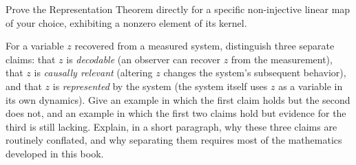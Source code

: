 \begin{exercise}
Prove the Representation Theorem directly for a specific non-injective
linear map of your choice, exhibiting a nonzero element of its kernel.
\end{exercise}

\begin{exercise}[Capstone]
For a variable $z$ recovered from a measured system, distinguish three
separate claims: that $z$ is \emph{decodable} (an observer can recover
$z$ from the measurement), that $z$ is \emph{causally relevant} (altering
$z$ changes the system's subsequent behavior), and that $z$ is
\emph{represented} by the system (the system itself uses $z$ as a
variable in its own dynamics). Give an example in which the first claim
holds but the second does not, and an example in which the first two
claims hold but evidence for the third is still lacking. Explain, in a
short paragraph, why these three claims are routinely conflated, and why
separating them requires most of the mathematics developed in this book.
\end{exercise}
